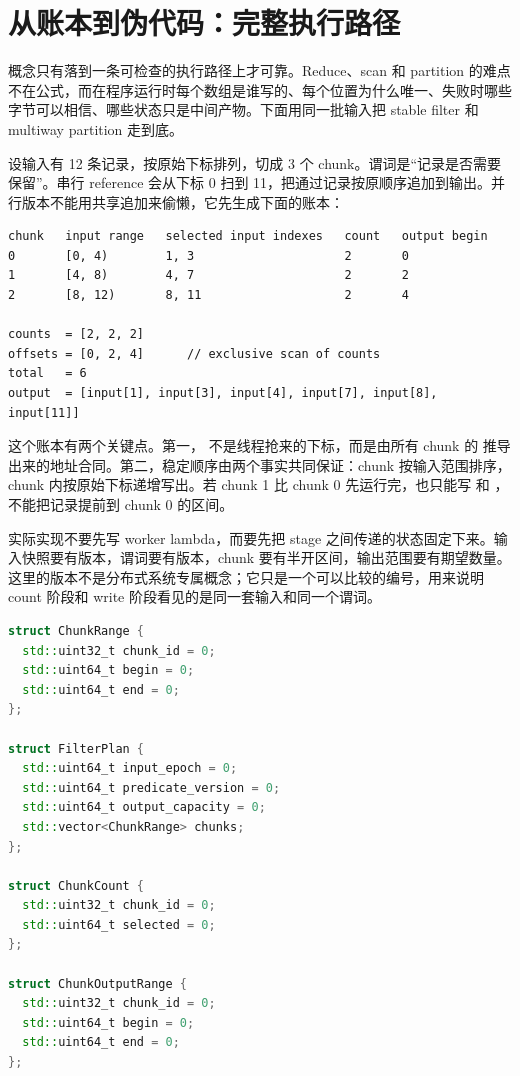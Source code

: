 \section{从账本到伪代码：完整执行路径}

概念只有落到一条可检查的执行路径上才可靠。Reduce、scan 和 partition 的难点不在公式，而在程序运行时每个数组是谁写的、每个位置为什么唯一、失败时哪些字节可以相信、哪些状态只是中间产物。下面用同一批输入把 stable filter 和 multiway partition 走到底。

设输入有 12 条记录，按原始下标排列，切成 3 个 chunk。谓词是“记录是否需要保留”。串行 reference 会从下标 0 扫到 11，把通过记录按原顺序追加到输出。并行版本不能用共享追加来偷懒，它先生成下面的账本：

\begin{lstlisting}[numbers=none,caption={stable filter 的 count 和 offset 账本}]
chunk   input range   selected input indexes   count   output begin
0       [0, 4)        1, 3                     2       0
1       [4, 8)        4, 7                     2       2
2       [8, 12)       8, 11                    2       4

counts  = [2, 2, 2]
offsets = [0, 2, 4]      // exclusive scan of counts
total   = 6
output  = [input[1], input[3], input[4], input[7], input[8], input[11]]
\end{lstlisting}

这个账本有两个关键点。第一， 不是线程抢来的下标，而是由所有 chunk 的  推导出来的地址合同。第二，稳定顺序由两个事实共同保证：chunk 按输入范围排序，chunk 内按原始下标递增写出。若 chunk 1 比 chunk 0 先运行完，也只能写  和 ，不能把记录提前到 chunk 0 的区间。

实际实现不要先写 worker lambda，而要先把 stage 之间传递的状态固定下来。输入快照要有版本，谓词要有版本，chunk 要有半开区间，输出范围要有期望数量。这里的版本不是分布式系统专属概念；它只是一个可以比较的编号，用来说明 count 阶段和 write 阶段看见的是同一套输入和同一个谓词。

\begin{lstlisting}[language=C++,caption={stable filter 的状态对象草图}]
struct ChunkRange {
  std::uint32_t chunk_id = 0;
  std::uint64_t begin = 0;
  std::uint64_t end = 0;
};

struct FilterPlan {
  std::uint64_t input_epoch = 0;
  std::uint64_t predicate_version = 0;
  std::uint64_t output_capacity = 0;
  std::vector<ChunkRange> chunks;
};

struct ChunkCount {
  std::uint32_t chunk_id = 0;
  std::uint64_t selected = 0;
};

struct ChunkOutputRange {
  std::uint32_t chunk_id = 0;
  std::uint64_t begin = 0;
  std::uint64_t end = 0;
};
\end{lstlisting}

